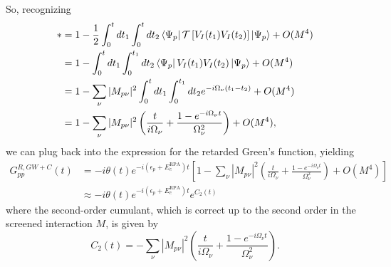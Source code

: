 So, recognizing 
\begin{align}
* &=
1 - \frac{1}{2} \int_0^t dt_1 \int_0^t dt_2 \bra{\Psi_p} \mathcal{T} \left[ V_I(t_1) V_I(t_2) \right] \ket{\Psi_p} + O(M^4)
\\&=
1 - \int_0^t dt_1 \int_0^{t_1} dt_2 \bra{\Psi_p} V_I(t_1) V_I(t_2) \ket{\Psi_p} + O(M^4) \\
&=
1 - \sum_\nu |M_{p\nu}|^2 \int_0^t dt_1 \int_0^{t_1} dt_2 e^{-i\Omega_\nu (t_1 - t_2)} + O(M^4) \\
&=
1 - \sum_\nu |M_{p\nu}|^2 \left( \frac{t}{i\Omega_\nu} + \frac{1 - e^{-i\Omega_\nu t}}{\Omega_\nu^2} \right) + O(M^4),
\end{align} 
we can plug back into the expression for the retarded Green's function, yielding
\begin{align}
G_{pp}^{R,GW+C}(t)
&=
-i \theta(t) e^{-i(\epsilon_p + E_c^{\text{RPA}}) t} \left[1 - \sum_\nu |M_{p\nu}|^2 \left( \frac{t}{i\Omega_\nu} + \frac{1 - e^{-i\Omega_\nu t}}{\Omega_\nu^2} \right) + O(M^4) \right] \\
&\approx
-i \theta(t) e^{-i(\epsilon_p + E_c^{\text{RPA}}) t} e^{C_2(t)}
\end{align}
where the second-order cumulant, which is correct up to the second order in the screened interaction $M$, is given by
\begin{equation}
C_2(t) = -\sum_\nu |M_{p\nu}|^2\left(\frac{t}{i\Omega_\nu}+\frac{1-e^{-i\Omega_\nu t}}{\Omega_\nu^2}\right).
\end{equation} 
